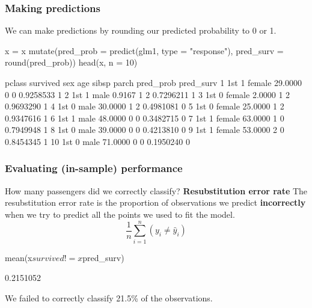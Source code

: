 \documentclass[a4paper]{article}
\begin{document}
\subsubsection{Making predictions}
We can make predictions by rounding our predicted probability to 0 or 1.
\begin{Schunk}
\begin{Sinput}
x = x %
  mutate(pred_prob = predict(glm1, type = "response"),
         pred_surv = round(pred_prob))
head(x, n = 10)
\end{Sinput}
\begin{Soutput}
   pclass survived    sex     age sibsp parch pred_prob pred_surv
1     1st        1 female 29.0000     0     0 0.9258533         1
2     1st        1   male  0.9167     1     2 0.7296211         1
3     1st        0 female  2.0000     1     2 0.9693290         1
4     1st        0   male 30.0000     1     2 0.4981081         0
5     1st        0 female 25.0000     1     2 0.9347616         1
6     1st        1   male 48.0000     0     0 0.3482715         0
7     1st        1 female 63.0000     1     0 0.7949948         1
8     1st        0   male 39.0000     0     0 0.4213810         0
9     1st        1 female 53.0000     2     0 0.8454345         1
10    1st        0   male 71.0000     0     0 0.1950240         0
\end{Soutput}
\end{Schunk}
\subsubsection{Evaluating (in-sample) performance}
How many passengers did we correctly classify?
\textbf{Resubstitution error rate}
The \textcolor{myblue}{resubstitution error rate} is the proportion of observations we predict \textcolor{myblue}{\textbf{incorrectly}} when we try to predict all the points we used to fit the model.
\[
	\frac{1}{n}\sum_{i=1}^n (y_i \neq \hat{y}_i)
\]
\begin{Schunk}
\begin{Sinput}
mean(x$survived != x$pred_surv)
\end{Sinput}
\begin{Soutput}
[1] 0.2151052
\end{Soutput}
\end{Schunk}
We failed to correctly classify 21.5\% of the observations.
\end{document}
